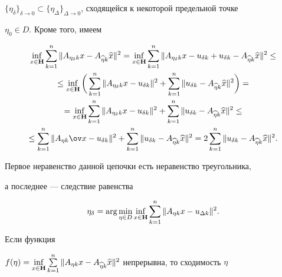 $\{\eta_\delta \}_{\delta \to 0}\subset \{\eta_\Delta


\}_{\Delta \to 0}$, сходящейся к некоторой предельной точке 


$\eta_0\in D$. Кроме того, имеем 


\begin{multline*}


\inf_{x\in {\bold H }}\sum_{k=1}^n\| A_{\eta_\delta k}x-A_{\widehat 


\eta k}\widehat x \|^2=\inf_{x\in {\bold H }}\sum_{k=1}^n\| 


A_{\eta_\delta k}x-u_{\delta k}+u_{\delta k}-A_{\widehat \eta k}\widehat x \| 


^2\leq \\


%


\leq \inf_{x\in {\bold H }}\bigg( \sum_{k=1}^n\| A_{\eta_\delta


k}x-u_{\delta k}\|^2+\sum_{k=1}^n\| u_{\delta k}-A_{\widehat \eta k}


\widehat x \|^2\bigg) = \\


%


=\inf_{x\in {\bold H }}\sum_{k=1}^n\| A_{\eta_\delta k}x-u_{\delta


k}\|^2+\sum_{k=1}^n\| u_{\delta k}-A_{\widehat \eta k}\widehat x 


\|^2\leq \\


%


\leq \sum_{k=1}^n\| A_{\eta k}\ov x-u_{\delta k}\|


^2+\sum_{k=1}^n\| u_{\delta k}-A_{\widehat \eta k}\widehat x \|^2=


2\sum_{k=1}^n\| u_{\delta k}-A_{\widehat \eta k}\widehat x \|^2. 


\end{multline*}


Первое неравенство данной цепочки есть неравенство треугольника,


а последнее --- следствие равенства


$$


\eta_\delta =\arg \min_{\eta \in


D}\inf_{x\in {\bold H}}\sum_{k=1}^n\| A_{\eta k}x-u_{\Delta k}\|^2.


$$


Если функция


$f(\eta )=\inf\limits_{x\in {\bold H}}\sum\limits_{k=1}^n\| A_{\eta


k}x-A_{\widehat \eta k}\widehat x\|^2$ непрерывна, то сходимость $\eta $


